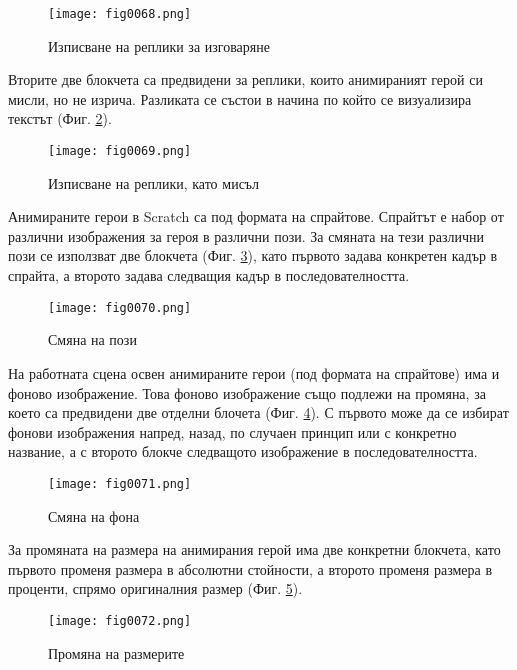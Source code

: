 \begin{figure}[H]
  \centering
  \texttt{[image: fig0068.png]}
  \caption{Изписване на реплики за изговаряне}
\label{fig0068}
\end{figure}

Вторите две блокчета са предвидени за реплики, които анимираният герой си мисли, но не изрича. Разликата се състои в начина по който се визуализира текстът (Фиг. \ref{fig0069}).

\begin{figure}[H]
  \centering
  \texttt{[image: fig0069.png]}
  \caption{Изписване на реплики, като мисъл}
\label{fig0069}
\end{figure}

Анимираните герои в Scratch са под формата на спрайтове. Спрайтът е набор от различни изображения за героя в различни пози. За смяната на тези различни пози се използват две блокчета (Фиг. \ref{fig0070}), като първото задава конкретен кадър в спрайта, а второто задава следващия кадър в последователността.

\begin{figure}[H]
  \centering
  \texttt{[image: fig0070.png]}
  \caption{Смяна на пози}
\label{fig0070}
\end{figure}

На работната сцена освен анимираните герои (под формата на спрайтове) има и фоново изображение. Това фоново изображение също подлежи на промяна, за което са предвидени две отделни блочета (Фиг. \ref{fig0071}). С първото може да се избират фонови изображения напред, назад, по случаен принцип или с конкретно название, а с второто блокче следващото изображение в последователността. 

\begin{figure}[H]
  \centering
  \texttt{[image: fig0071.png]}
  \caption{Смяна на фона}
\label{fig0071}
\end{figure}

За промяната на размера на анимирания герой има две конкретни блокчета, като първото променя размера в абсолютни стойности, а второто променя размера в проценти, спрямо оригиналния размер (Фиг. \ref{fig0072}).

\begin{figure}[H]
  \centering
  \texttt{[image: fig0072.png]}
  \caption{Промяна на размерите}
\label{fig0072}
\end{figure}

